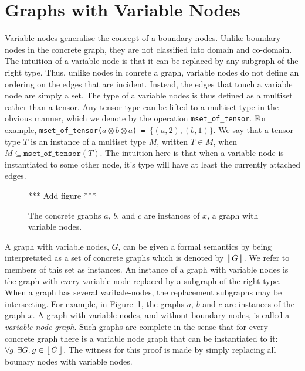 \documentclass[runningheads]{llncs}
\newcommand{\tensor}{\otimes}
\newcommand{\vinterp}[1]{\lfloor\hspace{-0.27em}|\, #1\, |\hspace{-0.27em}\rfloor}
\begin{document}
\section{Graphs with Variable Nodes}

Variable nodes generalise the concept of a boundary nodes. Unlike
boundary-nodes in the concrete graph, they are not classified into
domain and co-domain. The intuition of a variable node is that it can
be replaced by any subgraph of the right type. Thus, unlike nodes in
conrete a graph, variable nodes do not define an ordering on the edges
that are incident. Instead, the edges that touch a variable node are
simply a set. The type of a variable nodes is thus defined as a
multiset rather than a tensor. Any tensor type can be lifted to a
multiset type in the obvious manner, which we denote by the operation
{\tt mset\_of\_tensor}. For example, {\tt mset\_of\_tensor($a \tensor
  b \tensor a$) = $\{(a,2), (b,1)\}$}. We say that a tensor-type $T$
is an instance of a multiset type $M$, written $T \in M$, when $M
\subseteq \mathtt{mset\_of\_tensor}(T)$. The intuition here is that
when a variable node is instantiated to some other node, it's type
will have at least the currently attached edges.

\begin{figure}[t]
*** Add figure *** 
\label{node-variable-instances-fig}\caption{The concrete graphs $a$,
  $b$, and $c$ are instances of $x$, a graph with variable nodes.}
\end{figure}

A graph with variable nodes, $G$, can be given a formal semantics by
being interpretated as a set of concrete graphs which is denoted by
$\vinterp{G}$. We refer to members of this set as instances. An
instance of a graph with variable nodes is the graph with every
variable node replaced by a subgraph of the right type. When a graph
has several varibale-nodes, the replacement subgraphs may be
intersecting. For example, in
Figure~\ref{node-variable-instances-fig}, the graphs $a$, $b$ and $c$
are instances of the graph $x$. A graph with variable nodes, and
without boundary nodes, is called a \emph{variable-node graph}. Such
graphs are complete in the sense that for every concrete graph there
is a variable node graph that can be instantiated to it: $\forall
g.\,\exists G.\,g \in \vinterp{G}$. The witness for this proof is made
by simply replacing all bounary nodes with variable nodes.

\end{document}
